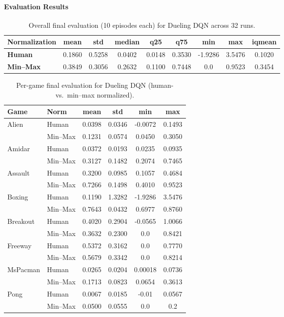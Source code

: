 \paragraph{Evaluation Results}

\begin{table}
	\caption{Overall final evaluation (10 episodes each) for Dueling DQN across 32 runs.}
	\label{tab:dueling_dqn_eval_overall}
	\centering
	\begin{tabular}{lcccccccc}
		\toprule
		\textbf{Normalization} & \textbf{mean} & \textbf{std} & \textbf{median} & 
		\textbf{q25} & \textbf{q75} & \textbf{min} & \textbf{max} & \textbf{iqmean} \\
		\midrule
		\textbf{Human}   & 0.1860 & 0.5258 & 0.0402 & 0.0148 & 0.3530 & -1.9286 & 3.5476 & 0.1020 \\
		\textbf{Min--Max}& 0.3849 & 0.3056 & 0.2632 & 0.1100 & 0.7448 & 0.0 & 0.9523 & 0.3454 \\
		\bottomrule
	\end{tabular}
\end{table}

\begin{table}
	\caption{Per-game final evaluation for Dueling DQN (human- vs.\ min--max normalized).}
	\label{tab:dueling_dqn_eval_gamewise}
	\centering
	\begin{tabular}{llcccc}
		\toprule
		\textbf{Game} & \textbf{Norm} & \textbf{mean} & \textbf{std} & \textbf{min} & \textbf{max}\\
		\midrule
		Alien     & Human    & 0.0398 & 0.0346 & -0.0072 & 0.1493 \\
		& Min--Max & 0.1231 & 0.0574 & 0.0450  & 0.3050 \\
		\cmidrule{1-6}
		Amidar    & Human    & 0.0372 & 0.0193 & 0.0235 & 0.0935 \\
		& Min--Max & 0.3127 & 0.1482 & 0.2074 & 0.7465 \\
		\cmidrule{1-6}
		Assault   & Human    & 0.3200 & 0.0985 & 0.1057 & 0.4684 \\
		& Min--Max & 0.7266 & 0.1498 & 0.4010 & 0.9523 \\
		\cmidrule{1-6}
		Boxing    & Human    & 0.1190 & 1.3282 & -1.9286 & 3.5476 \\
		& Min--Max & 0.7643 & 0.0432 & 0.6977  & 0.8760 \\
		\cmidrule{1-6}
		Breakout  & Human    & 0.4020 & 0.2904 & -0.0565 & 1.0066 \\
		& Min--Max & 0.3632 & 0.2300 & 0.0     & 0.8421 \\
		\cmidrule{1-6}
		Freeway   & Human    & 0.5372 & 0.3162 & 0.0     & 0.7770 \\
		& Min--Max & 0.5679 & 0.3342 & 0.0     & 0.8214 \\
		\cmidrule{1-6}
		MsPacman  & Human    & 0.0265 & 0.0204 & 0.00018 & 0.0736 \\
		& Min--Max & 0.1713 & 0.0823 & 0.0654  & 0.3613 \\
		\cmidrule{1-6}
		Pong      & Human    & 0.0067 & 0.0185 & -0.01 & 0.0567 \\
		& Min--Max & 0.0500 & 0.0555 & 0.0   & 0.2 \\
		\bottomrule
	\end{tabular}
\end{table}

